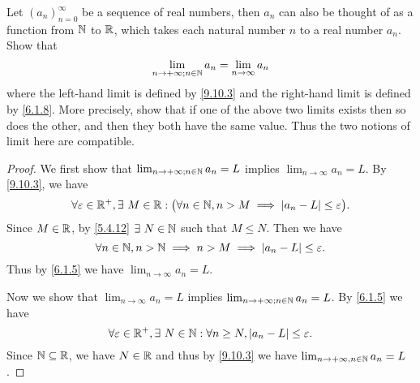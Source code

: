 \exercisesection

\begin{ex}\label{ex:9.10.1}
  Let \((a_n)_{n = 0}^\infty\) be a sequence of real numbers, then \(a_n\) can also be thought of as a function from \(\mathbb{N}\) to \(\mathbb{R}\), which takes each natural number \(n\) to a real number \(a_n\).
  Show that
  \[
    \lim_{n \to +\infty ; n \in \mathbb{N}} a_n = \lim_{n \to \infty} a_n
  \]
  where the left-hand limit is defined by \cref{9.10.3} and the right-hand limit is defined by \cref{6.1.8}.
  More precisely, show that if one of the above two limits exists then so does the other, and then they both have the same value.
  Thus the two notions of limit here are compatible.
\end{ex}

\begin{proof}
  We first show that \(\lim_{n \to +\infty ; n \in \mathbb{N}} a_n = L\) implies \(\lim_{n \to \infty} a_n = L\).
  By \cref{9.10.3}, we have
  \[
    \forall \varepsilon \in \mathbb{R}^+, \exists\ M \in \mathbb{R} : \big(\forall n \in \mathbb{N}, n > M \implies \left\lvert a_n - L\right\rvert \leq \varepsilon\big).
  \]
  Since \(M \in \mathbb{R}\), by \cref{5.4.12} \(\exists\ N \in \N\) such that \(M \leq N\).
  Then we have
  \[
    \forall n \in \mathbb{N}, n > \mathbb{N} \implies n > M \implies \left\lvert a_n - L\right\rvert \leq \varepsilon.
  \]
  Thus by \cref{6.1.5} we have \(\lim_{n \to \infty} a_n = L\).

  Now we show that \(\lim_{n \to \infty} a_n = L\) implies \(\lim_{n \to +\infty ; n \in \mathbb{N}} a_n = L\).
  By \cref{6.1.5} we have
  \[
    \forall \varepsilon \in \mathbb{R}^+, \exists\ N \in \mathbb{N} : \forall n \geq N, \left\lvert a_n - L\right\rvert \leq \varepsilon.
  \]
  Since \(\mathbb{N} \subseteq \mathbb{R}\), we have \(N \in \mathbb{R}\) and thus by \cref{9.10.3} we have \(\lim_{n \to +\infty, n \in \mathbb{N}} a_n = L\).
\end{proof}